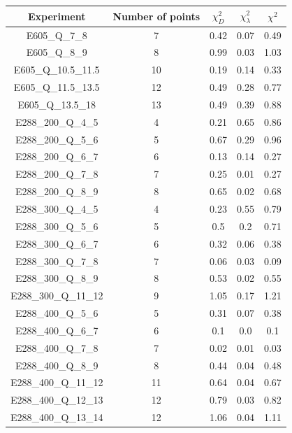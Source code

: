 \documentclass[
]{article}
\begin{document}
\begin{table}[h]

\centering

\begin{tabular}{|c|c|c|c|c|} \hline

\textbf{Experiment} & \textbf{Number of
points} & \textbf{\(\chi_{D}^2\)} & \textbf{\(\chi_{\lambda}^2\)} & \textbf{\(\chi^2\)} \\ \hline

E605\_Q\_7\_8 & 7 & 0.42 & 0.07 & 0.49 \\ \hline
E605\_Q\_8\_9 & 8 & 0.99 & 0.03 & 1.03 \\ \hline
E605\_Q\_10.5\_11.5 & 10 & 0.19 & 0.14 & 0.33 \\ \hline
E605\_Q\_11.5\_13.5 & 12 & 0.49 & 0.28 & 0.77 \\ \hline
E605\_Q\_13.5\_18 & 13 & 0.49 & 0.39 & 0.88 \\ \hline
E288\_200\_Q\_4\_5 & 4 & 0.21 & 0.65 & 0.86 \\ \hline
E288\_200\_Q\_5\_6 & 5 & 0.67 & 0.29 & 0.96 \\ \hline
E288\_200\_Q\_6\_7 & 6 & 0.13 & 0.14 & 0.27 \\ \hline
E288\_200\_Q\_7\_8 & 7 & 0.25 & 0.01 & 0.27 \\ \hline
E288\_200\_Q\_8\_9 & 8 & 0.65 & 0.02 & 0.68 \\ \hline
E288\_300\_Q\_4\_5 & 4 & 0.23 & 0.55 & 0.79 \\ \hline
E288\_300\_Q\_5\_6 & 5 & 0.5 & 0.2 & 0.71 \\ \hline
E288\_300\_Q\_6\_7 & 6 & 0.32 & 0.06 & 0.38 \\ \hline
E288\_300\_Q\_7\_8 & 7 & 0.06 & 0.03 & 0.09 \\ \hline
E288\_300\_Q\_8\_9 & 8 & 0.53 & 0.02 & 0.55 \\ \hline
E288\_300\_Q\_11\_12 & 9 & 1.05 & 0.17 & 1.21 \\ \hline
E288\_400\_Q\_5\_6 & 5 & 0.31 & 0.07 & 0.38 \\ \hline
E288\_400\_Q\_6\_7 & 6 & 0.1 & 0.0 & 0.1 \\ \hline
E288\_400\_Q\_7\_8 & 7 & 0.02 & 0.01 & 0.03 \\ \hline
E288\_400\_Q\_8\_9 & 8 & 0.44 & 0.04 & 0.48 \\ \hline
E288\_400\_Q\_11\_12 & 11 & 0.64 & 0.04 & 0.67 \\ \hline
E288\_400\_Q\_12\_13 & 12 & 0.79 & 0.03 & 0.82 \\ \hline
E288\_400\_Q\_13\_14 & 12 & 1.06 & 0.04 & 1.11 \\ \hline

\end{tabular}
\end{table}
\end{document}

